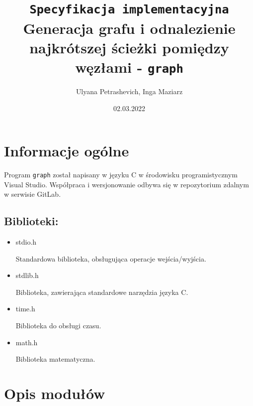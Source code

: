 \documentclass[]{article}
\title{\texttt{Specyfikacja implementacyjna}\\Generacja grafu i odnalezienie najkrótszej ścieżki pomiędzy węzłami - \texttt{graph}}
\author{Ulyana Petrashevich, Inga Maziarz}
\date{02.03.2022}
\begin{document}
\maketitle

\section{Informacje ogólne}\label{header-n231}

Program \texttt{graph} został napisany w języku C w środowisku programistycznym Visual Studio. Współpraca i wersjonowanie odbywa się w repozytorium zdalnym w serwisie GitLab.

\subsection{Biblioteki:}
\begin{itemize}
    \item stdio.h
    
    Standardowa biblioteka, obsługująca operacje wejścia/wyjścia.
    \item stdlib.h
    
    Biblioteka, zawierająca standardowe narzędzia języka C.
    \item time.h
    
    Biblioteka do obsługi czasu.
    \item math.h
    
    Biblioteka matematyczna.
\end{itemize}

\section{Opis modułów}\label{header-n233}
\end{document}
